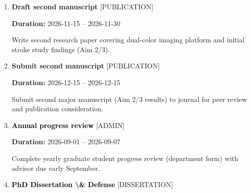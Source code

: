 \documentclass[landscape,a4paper]{article}
\begin{document}
\begin{enumerate}[leftmargin=1.5cm, itemsep=1em]
    \item \textcolor{researchout}{\textbf{\large Draft second manuscript}}
          \hfill \textcolor{black!60}{\small [PUBLICATION]}
          
          \vspace{0.2em}
          \textcolor{black!70}{\textbf{Duration:} 2026-11-15 -- 2026-11-30}

          \vspace{0.4em}
          \begin{minipage}[t]{0.9\textwidth}
          \textcolor{black!85}{Write second research paper covering dual-color imaging platform and initial stroke study findings (Aim 2/3).}
          \end{minipage}


    \item \textcolor{researchout}{\textbf{\large Submit second manuscript}}
          \hfill \textcolor{black!60}{\small [PUBLICATION]}
          
          \vspace{0.2em}
          \textcolor{black!70}{\textbf{Duration:} 2026-12-15 -- 2026-12-15}

          \vspace{0.4em}
          \begin{minipage}[t]{0.9\textwidth}
          \textcolor{black!85}{Submit second major manuscript (Aim 2/3 results) to journal for peer review and publication consideration.}
          \end{minipage}


    \item \textcolor{black}{\textbf{\large Annual progress review}}
          \hfill \textcolor{black!60}{\small [ADMIN]}
          
          \vspace{0.2em}
          \textcolor{black!70}{\textbf{Duration:} 2026-09-01 -- 2026-09-07}

          \vspace{0.4em}
          \begin{minipage}[t]{0.9\textwidth}
          \textcolor{black!85}{Complete yearly graduate student progress review (department form) with advisor due early September.}
          \end{minipage}


    \item \textcolor{black}{\textbf{\large PhD Dissertation \textbackslash{}& Defense}}
          \hfill \textcolor{black!60}{\small [DISSERTATION]}
          

\end{enumerate}
\end{document}
